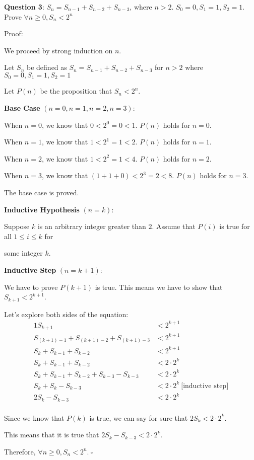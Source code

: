 \documentclass{article} %
\newcommand{\question}[2][]{\begin{flushleft}
        \textbf{Question #1}: #2

\end{flushleft}}
\begin{document}
    \newpage

    \question[3]{$S_n = S_{n - 1} + S_{n - 2} + S_{n - 3}$, where $n > 2$. $S_0 = 0, S_1 = 1, S_2 = 1$. Prove $\forall n \geq 0, S_n < 2^n$}

    Proof:

    We proceed by strong induction on $n$.

    Let $S_n$ be defined as $S_n = S_{n - 1} + S_{n - 2} + S_{n - 3}$ for $n > 2$ where $S_0 = 0, S_1 = 1, S_2 = 1$

    Let $P(n)$ be the proposition that $S_n < 2^n$. 

    \textbf{Base Case} $(n = 0, n = 1, n = 2, n = 3)$:

    When $n = 0$, we know that $0 < 2 ^ 0 = 0 < 1$. $P(n)$ holds for $n = 0$.

    When $n = 1$, we know that $1 < 2 ^ 1 = 1 < 2$. $P(n)$ holds for $n = 1$.

    When $n = 2$, we know that $1 < 2 ^ 2 = 1 < 4$. $P(n)$ holds for $n = 2$.

    When $n = 3$, we know that $(1 + 1 + 0) < 2 ^ 3 = 2 < 8$. $P(n)$ holds for $n = 3$.

    The base case is proved.

    \textbf{Inductive Hypothesis} $(n = k)$:

    Suppose $k$ is an arbitrary integer greater than $2$. Assume that $P(i)$ is true for all $1 \leq i \leq k$ for 
    
    some integer $k$.

    \textbf{Inductive Step} $(n = k + 1)$:

    We have to prove $P(k + 1)$ is true. This means we have to show that $S_{k + 1} < 2^{k + 1}$.

    Let's explore both sides of the equation:
    \begin{alignat*}{1}
        S_{k + 1} &< 2^{k + 1}\\
        S_{(k + 1) - 1} + S_{(k + 1) - 2} + S_{(k + 1) - 3} &< 2^{k + 1}\\
        S_{k} + S_{k - 1} + S_{k - 2} &< 2^{k + 1}\\
        S_{k} + S_{k - 1} + S_{k - 2} &< 2 \cdot 2^{k}\\
        S_{k} + S_{k - 1} + S_{k - 2} + S_{k - 3} - S_{k - 3} &< 2 \cdot 2^{k}\\
        S_{k} + S_k - S_{k - 3} &< 2 \cdot 2^{k}\ \text{[inductive step]}\\
        2S_{k}- S_{k - 3} &< 2 \cdot 2^{k}\\
    \end{alignat*}

    Since we know that $P(k)$ is true, we can say for sure that $2S_k < 2 \cdot 2^k$.

    This means that it is true that $ 2S_{k}- S_{k - 3} < 2 \cdot 2^{k}$.

    Therefore, $\forall n \geq 0, S_n < 2^n.\ \square$
\end{document}
